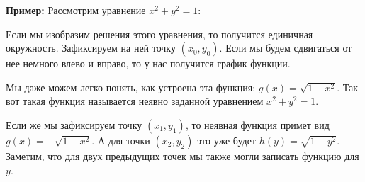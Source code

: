 \vspace*{5mm}

\textbf{Пример:}
Рассмотрим уравнение $x^2 + y^2 = 1$:
\begin{center}
\end{center}
Если мы изобразим решения этого уравнения, то получится единичная окружность.
Зафиксируем на ней точку $(x_0, y_0)$. 
Если мы будем сдвигаться от нее немного влево и вправо, то у нас получится график функции.

Мы даже можем легко понять, как устроена эта функция: $g(x) = \sqrt{1 - x^2}$.
Так вот такая функция называется неявно заданной уравнением $x^2 + y^2 = 1$.

Если же мы зафиксируем точку $(x_1, y_1)$, то неявная функция примет вид $g(x) = -\sqrt{1 - x^2}$. 
А для точки $(x_2, y_2)$ это уже будет $h(y) = \sqrt{1 - y^2}$. 
Заметим, что для двух предыдущих точек мы также могли записать функцию для $y$.


